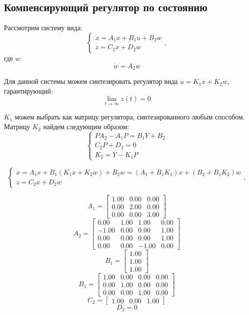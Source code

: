 \subsection{Компенсирующий регулятор по состоянию}

Рассмотрим систему вида:
\[
    \begin{cases}
        \dot{x} = A_1x + B_1u + B_2w \\
        z = C_2x + D_2 w
    \end{cases},
\]
где $w$:
\[
    \dot{w} = A_2w
\]

Для данной системы можем синтезировать регулятор вида $u = K_1x + K_2w$, гарантирующий:
\begin{equation*}
    \lim_{t\to\infty} z(t) = 0
\end{equation*}

$K_1$ можем выбрать как матрицу регулятора, синтезированного любым способом. Матрицу $K_2$ найдем следующим образом:
\[
    \begin{cases}
        PA_2 - A_1P = B_1Y + B_2\\
        C_2P + D_2 = 0 \\
        K_2 = Y - K_1P
    \end{cases}
\]

\[
    \begin{cases}
        \dot{x} = A_1x + B_1 (K_1x + K_2w) + B_2w = (A_1 + B_1 K_1) x + (B_2 + B_1 K_2)w \\
        z = C_2x + D_2 w
    \end{cases},
\]

\[A_1 = \begin{bmatrix}
  1.00 &  0.00 &  0.00\\
  0.00 &  2.00 &  0.00\\
  0.00 &  0.00 &  3.00
\end{bmatrix}\]
\[A_2 = \begin{bmatrix}
  0.00 &  1.00 &  1.00 &  0.00\\
 -1.00 &  0.00 &  0.00 &  1.00\\
  0.00 &  0.00 &  0.00 &  1.00\\
  0.00 &  0.00 & -1.00 &  0.00
\end{bmatrix}\]
\[B_1 = \begin{bmatrix}
  1.00\\
  1.00\\
  1.00
\end{bmatrix}\]
\[B_1 = \begin{bmatrix}
  1.00 &  0.00 &  0.00 &  0.00\\
  0.00 &  1.00 &  0.00 &  0.00\\
  0.00 &  0.00 &  1.00 &  0.00
\end{bmatrix}\]
\[C_2 = \begin{bmatrix}
  1.00 &  0.00 &  1.00
\end{bmatrix}\]
\[D_2 = 0\]

